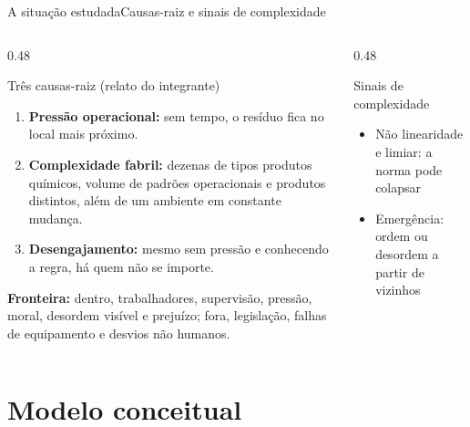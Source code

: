\documentclass[aspectratio=169, 10pt]{beamer}
\begin{document}
\begin{frame}{A situação estudada}{Causas-raiz e sinais de complexidade}
  \begin{columns}[T]
    \begin{column}{0.48\textwidth}
      \begin{block}{Três causas-raiz (relato do integrante)}
        \begin{enumerate}
          \item \textbf{Pressão operacional:} sem tempo, o resíduo fica no local mais próximo.
          \item \textbf{Complexidade fabril:} dezenas de tipos produtos químicos, volume de padrões operacionais e produtos distintos, além de um ambiente em constante mudança.
          \item \textbf{Desengajamento:} mesmo sem pressão e conhecendo a regra, há quem não se importe.
        \end{enumerate}
      \end{block}
      \small\textbf{Fronteira:} dentro, trabalhadores, supervisão, pressão, moral, desordem visível e prejuízo; fora, legislação, falhas de equipamento e desvios não humanos.
    \end{column}
    \begin{column}{0.48\textwidth}
      \begin{exampleblock}{Sinais de complexidade}
        \begin{itemize}
          \item Não linearidade e limiar: a norma pode colapsar
          \item Emergência: ordem ou desordem a partir de vizinhos
        \end{itemize}
      \end{exampleblock}
    \end{column}
  \end{columns}
\end{frame}

\section{Modelo conceitual}
\end{document}
